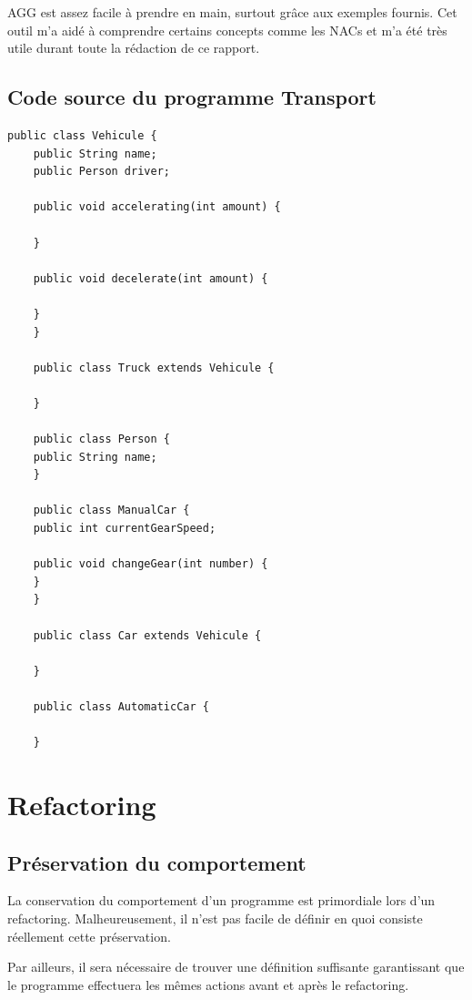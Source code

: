 \documentclass[a4paper, 12pt]{article}
\begin{document}
  AGG est assez facile à prendre en main, surtout grâce aux exemples fournis. Cet outil m'a aidé à comprendre certains concepts comme les NACs et m'a été très utile durant toute la rédaction de ce rapport.

  \subsection{Code source du programme Transport}

  \begin{lstlisting}[frame=single]
    public class Vehicule {
    public String name;
    public Person driver;

    public void accelerating(int amount) {

    }

    public void decelerate(int amount) {

    }
    }

    public class Truck extends Vehicule {

    }

    public class Person {
    public String name;
    }

    public class ManualCar {
    public int currentGearSpeed;

    public void changeGear(int number) {
    }
    }

    public class Car extends Vehicule {

    }

    public class AutomaticCar {

    }
  \end{lstlisting}

  \newpage
  \section{Refactoring}

  \subsection{Préservation du comportement}
  \label{subsec:preservationDuComportement}

  La conservation du comportement d'un programme est primordiale lors d'un refactoring.
  Malheureusement, il n'est pas facile de définir en quoi consiste réellement cette préservation.

  Par ailleurs, il sera nécessaire de trouver une définition suffisante garantissant que le programme effectuera les mêmes actions avant et après le refactoring.
\end{document}
